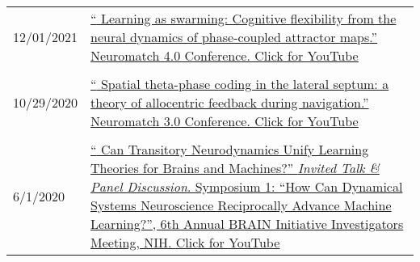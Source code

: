 \documentclass[10pt]{article}
\newcommand{\itemtitle}[1]{{\color{hopkinsblue}\ul{#1}}}
\newcommand{\unpubtitle}[1]{{\color{hopkinsblue} #1}}
\begin{document}

\begin{longtable}{@{\hspace{0.2in}}l>{\raggedright\arraybackslash}p{}}
  12/01/2021 \hspace{0.2in} &
  \href{https://youtu.be/3mKkLksOyfk}{``\unpubtitle{Learning as swarming:
      Cognitive flexibility from the neural dynamics of phase-coupled attractor
    maps}.'' Neuromatch 4.0 Conference.
  \itemtitle{Click for YouTube}}\\
  \tabularnewline
  10/29/2020 \hspace{0.2in} &
  \href{https://www.youtube.com/watch?v=WwYDMpD7j4Q}{``\unpubtitle{Spatial
      theta-phase coding in the lateral septum: a theory of allocentric feedback
    during navigation}.'' Neuromatch 3.0 Conference. \itemtitle{Click for YouTube}}\\
  \tabularnewline
  6/1/2020 \hspace{0.3in} &
  \href{https://youtu.be/2jy1ENYHRAw?t=902}{``\unpubtitle{Can Transitory
    Neurodynamics Unify Learning Theories for Brains and Machines?}''
    \emph{Invited Talk \& Panel Discussion}. Symposium 1: ``How Can Dynamical
    Systems Neuroscience Reciprocally Advance Machine Learning?'', 6th Annual
    BRAIN Initiative Investigators Meeting, NIH. \itemtitle{Click for
  YouTube}}\\

\end{longtable}
\end{document}
